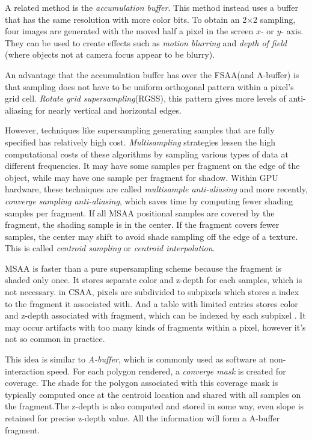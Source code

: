 \documentclass[10pt, a4paper]{article}
\begin{document}
                    A related method is the \emph{accumulation buffer}. This method instead uses a buffer that has the same resolution with more color bits. To obtain an 2$\times$2 sampling, four images are generated with the moved half a pixel in the screen $x$- or $y$- axis. They can be used to create effects such as \emph{motion blurring} and \emph{depth of field} (where objects not at camera focus appear to be blurry). 
                    
                    An advantage that the accumulation buffer has over the FSAA(and A-buffer) is that sampling does not have to be uniform orthogonal pattern within a pixel's grid cell. \emph{Rotate grid supersampling}(RGSS), this pattern gives more levels of anti-aliasing for nearly vertical and horizontal edges. 
                    
                    However, techniques like supersampling generating samples that are fully specified has relatively high cost. \emph{Multisampling} strategies lessen the high computational costs of these algorithms by sampling various types of data at different frequencies. It may have some samples per fragment on the edge of the object,  while may have one sample per fragment for shadow. Within GPU hardware, these techniques are called \emph{multisample anti-aliasing} and more recently, \emph{converge sampling anti-aliasing}, which saves time by computing fewer shading samples per fragment. If all MSAA positional samples are covered by the fragment, the shading sample is in the center. If the fragment covers fewer samples, the center may shift to avoid shade sampling off the edge of a texture. This is called \emph{centroid sampling} or \emph{centroid interpolation}.

                    MSAA is faster than a pure supersampling scheme because the fragment is shaded only once. It stores separate color and z-depth for each samples, which is not necessary. in CSAA, pixels are subdivided to subpixels which stores a index to the fragment it associated with. And a table with limited entries stores color and z-depth associated with fragment, which can be indexed by each subpixel  . It may occur artifacts with too many kinds of fragments within a pixel, however it's not so common in practice.

                    This idea is similar to \emph{A-buffer}, which is commonly used as software at non-interaction speed. For each polygon rendered, a \emph{converge mask} is created for coverage. The shade for the polygon associated with this coverage mask is typically computed once at the centroid location and shared with all samples on the fragment.The z-depth is also computed and stored in some way, even slope is retained for precise z-depth value. All the information will form a A-buffer fragment. 
                    
\end{document}
